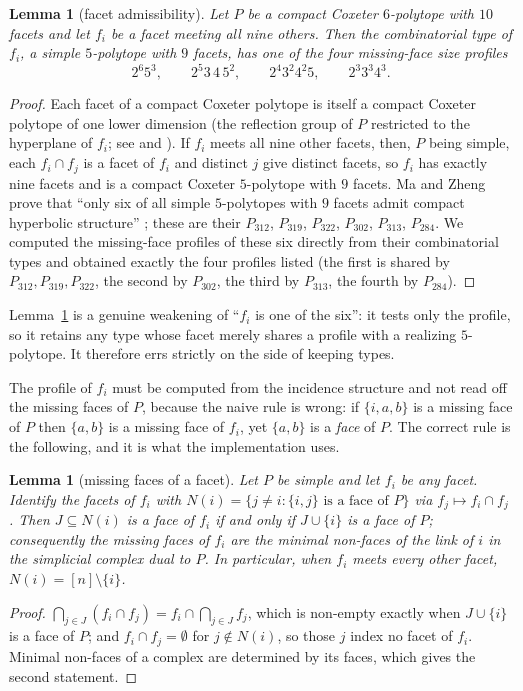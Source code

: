 \documentclass[11pt,reqno]{amsart}
\theoremstyle{plain}
\newtheorem{lemma}[theorem]{Lemma}
\theoremstyle{definition}
\begin{document}
\begin{lemma}[facet admissibility]
\label{lem:facet}
Let $P$ be a compact Coxeter $6$-polytope with $10$ facets and let $f_i$ be a
facet meeting all nine others. Then the combinatorial type of $f_i$, a simple
$5$-polytope with $9$ facets, has one of the four missing-face size profiles
\[
2^6 5^3,\qquad 2^5 3\,4\,5^2,\qquad 2^4 3^2 4^2 5,\qquad 2^3 3^3 4^3 .
\]
\end{lemma}
\begin{proof}
Each facet of a compact Coxeter polytope is itself a compact Coxeter polytope of
one lower dimension (the reflection group of $P$ restricted to the hyperplane of
$f_i$; see \cite[Prop.~4.6]{Burcroff2024} and \cite{Vinberg1985}). If $f_i$
meets all nine other facets, then, $P$ being simple, each $f_i\cap f_j$ is a
facet of $f_i$ and distinct $j$ give distinct facets, so $f_i$ has exactly nine
facets and is a
compact Coxeter $5$-polytope with $9$ facets. Ma and Zheng prove that ``only six
of all simple $5$-polytopes with $9$ facets admit compact hyperbolic structure''
\cite[\S6, Tables~13--14]{MaZheng2023}; these are their $P_{312}$, $P_{319}$,
$P_{322}$, $P_{302}$, $P_{313}$, $P_{284}$. We computed the missing-face
profiles of these six directly from their combinatorial types and obtained
exactly the four profiles listed (the first is shared by $P_{312},P_{319},
P_{322}$, the second by $P_{302}$, the third by $P_{313}$, the fourth by
$P_{284}$).
\end{proof}

Lemma~\ref{lem:facet} is a genuine weakening of ``$f_i$ is one of the six'': it
tests only the profile, so it retains any type whose facet merely shares a
profile with a realizing $5$-polytope. It therefore errs strictly on the side of
keeping types.

The profile of $f_i$ must be computed from the incidence structure and not read off
the missing faces of $P$, because the naive rule is wrong: if $\{i,a,b\}$ is a
missing face of $P$ then $\{a,b\}$ is a missing face of $f_i$, yet $\{a,b\}$ is a
\emph{face} of $P$. The correct rule is the following, and it is what the
implementation uses.

\begin{lemma}[missing faces of a facet]
\label{lem:facetmf}
Let $P$ be simple and let $f_i$ be any facet. Identify the facets of $f_i$ with
$N(i)=\{j\neq i: \{i,j\}\text{ is a face of }P\}$ via $f_j\mapsto f_i\cap f_j$.
Then $J\subseteq N(i)$ is a face of $f_i$ if and only if $J\cup\{i\}$ is a face of
$P$; consequently the missing faces of $f_i$ are the minimal non-faces of the
link of $i$ in the simplicial complex dual to $P$. In particular, when $f_i$ meets
every other facet, $N(i)=[n]\setminus\{i\}$.
\end{lemma}
\begin{proof}
$\bigcap_{j\in J}(f_i\cap f_j)=f_i\cap\bigcap_{j\in J}f_j$, which is non-empty
exactly when $J\cup\{i\}$ is a face of $P$; and $f_i\cap f_j=\emptyset$ for
$j\notin N(i)$, so those $j$ index no facet of $f_i$. Minimal non-faces of a
complex are determined by its faces, which gives the second statement.
\end{proof}
\end{document}
